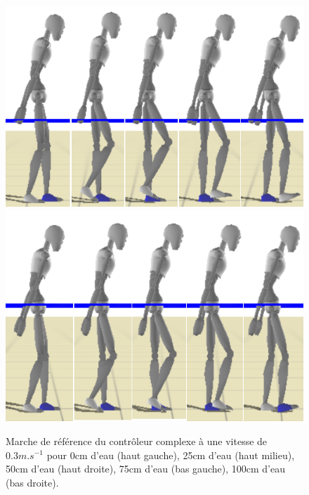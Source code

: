 \documentclass[runningheads,a4paper]{llncs}
\begin{document}
\begin{figure}[h]
\includegraphics[scale=0.3]{strips/03_75cm.png}
\includegraphics[scale=0.3]{strips/03_100cm.png}
\caption{Marche de référence du contrôleur complexe à une vitesse de $0.3m.s^{-1}$ pour 0cm d'eau (haut gauche), 25cm d'eau (haut milieu), 50cm d'eau (haut droite), 75cm d'eau (bas gauche), 100cm d'eau (bas droite).}
\label{fig:ref_mouv_07}
\end{figure}
\end{document}

